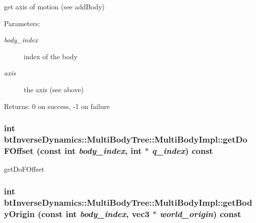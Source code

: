 get axis of motion (see addBody) \begin{Desc}
\item[Parameters:]
\begin{description}
\item[{\em body\_\-index}]index of the body \item[{\em axis}]the axis (see above) \end{description}
\end{Desc}
\begin{Desc}
\item[Returns:]0 on success, -1 on failure \end{Desc}
 \hypertarget{classbt_inverse_dynamics_1_1_multi_body_tree_1_1_multi_body_impl_4c00fcbd892f06e452ae3c8a8ffa6f19}{
\subsubsection[getDoFOffset]{\setlength{\rightskip}{0pt plus 5cm}int btInverseDynamics::MultiBodyTree::MultiBodyImpl::getDoFOffset (const int {\em body\_\-index}, \/  int $\ast$ {\em q\_\-index}) const}}
\label{classbt_inverse_dynamics_1_1_multi_body_tree_1_1_multi_body_impl_4c00fcbd892f06e452ae3c8a8ffa6f19}


getDoFOffset \hypertarget{classbt_inverse_dynamics_1_1_multi_body_tree_1_1_multi_body_impl_efc23817afea0d39e6a3786a6f5ba504}{
\subsubsection[getBodyOrigin]{\setlength{\rightskip}{0pt plus 5cm}int btInverseDynamics::MultiBodyTree::MultiBodyImpl::getBodyOrigin (const int {\em body\_\-index}, \/  {\bf vec3} $\ast$ {\em world\_\-origin}) const}}
\label{classbt_inverse_dynamics_1_1_multi_body_tree_1_1_multi_body_impl_efc23817afea0d39e6a3786a6f5ba504}


